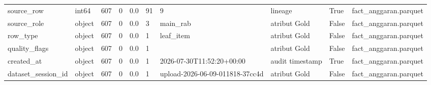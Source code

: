 \begin{longtable}{llllllllll}
source\_row & int64 & 607 & 0 & 0.0 & 91 & 9 & lineage & True & fact\_anggaran.parquet \\
source\_role & object & 607 & 0 & 0.0 & 3 & main\_rab & atribut Gold & False & fact\_anggaran.parquet \\
row\_type & object & 607 & 0 & 0.0 & 1 & leaf\_item & atribut Gold & False & fact\_anggaran.parquet \\
quality\_flags & object & 607 & 0 & 0.0 & 1 &  & atribut Gold & False & fact\_anggaran.parquet \\
created\_at & object & 607 & 0 & 0.0 & 1 & 2026-07-30T11:52:20+00:00 & audit timestamp & True & fact\_anggaran.parquet \\
dataset\_session\_id & object & 607 & 0 & 0.0 & 1 & upload-2026-06-09-011818-37cc4d & atribut Gold & False & fact\_anggaran.parquet \\
\end{longtable}
\endgroup
